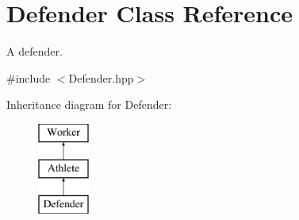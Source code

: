 \hypertarget{class_defender}{}\section{Defender Class Reference}
\label{class_defender}


A defender.  




{\ttfamily \#include $<$Defender.\+hpp$>$}

Inheritance diagram for Defender\+:\begin{figure}[H]
\begin{center}
\leavevmode
\includegraphics[height=3.000000cm]{class_defender}
\end{center}
\end{figure}
